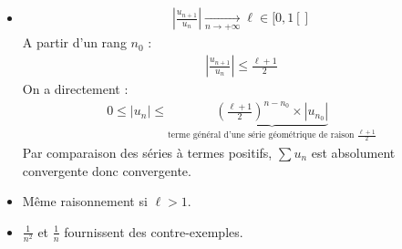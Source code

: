 \documentclass[../main.tex]{subfiles}
\begin{document}
\begin{itemize}
    \item \begin{align*}
        \left| \frac{u_{n+1}}{u_n} \right| \underset{n \to +\infty}{\longrightarrow} \ell\in [0, 1[]
    \end{align*}
    A partir d'un rang $n_0$ : 
    \begin{align*}
        \left| \frac{u_{n+1}}{u_n} \right| \leq \frac{\ell + 1}{2}
    \end{align*}
    On a directement : 
    \begin{align*}
        0 \leq |u_n| \leq \underbrace{\left( \frac{\ell + 1}{2} \right)^{n - n_0} \times |u_{n_0}|}_{\text{terme général d'une série géométrique de raison $\frac{\ell + 1}{2}$}}
    \end{align*}
    Par comparaison des séries à termes positifs, $\sum u_n$ est absolument convergente donc convergente. 
    \item Même raisonnement si $\ell > 1$. 
    \item $\frac{1}{n^2}$ et $\frac{1}{n}$ fournissent des contre-exemples. 
\end{itemize}
\end{document}
